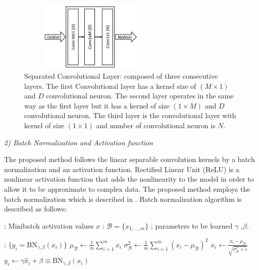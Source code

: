 \begin{figure}
\begin{center}
\includegraphics[height=34mm,width=7.0cm]{Figures/fig3.jpg}
\caption{Separated Convolutional Layer: composed of three consecutive layers. The first Convolutional layer has a kernel size of $(M\times1)$ and $D$  convolutional neuron. The second layer  operates in the same way as the first layer but it has a kernel of size $(1\times M)$ and $D$ convolutional neuron. The third layer is the convolutional layer with kernel of size $(1\times1)$ and number of convolutional neuron is $N$.}
\end{center}
\label{fig3}
\end{figure}

\textit{2)  Batch Normalization and  Activation function}

The proposed method follows the linear separable convolution kernels by a batch normalization and an activation function. Rectified Linear Unit (ReLU) is a nonlinear activation  function that adds the nonlinearity to the model in order to allow it to be approximate to complex data. The proposed method employs the batch normalization which is described in \cite{batchnorm}. Batch normalization algorithm is described as follows:



\vspace*{1.3\baselineskip}
\begin{algorithmic}[1]

\REQUIRE : Minibatch activation values $x$ : $\mathcal B = \{x_{1,\ldots,m}\}$ ; parameters to be learned $\gamma$ ,$\beta$.

\ENSURE  : $\{y_i = \mathrm{BN}_{\gamma,\beta}(x_i)\}$
\vspace*{.7\baselineskip}
\STATE $\mu_{\mathcal B} \leftarrow \frac1m \sum_{i = 1}^m x_i$
\vspace*{.7\baselineskip}
\STATE $\sigma^2_{\mathcal B} \leftarrow \frac1m \sum_{i=1}^m (x_i - \mu_{\mathcal B})^2$
\vspace*{.7\baselineskip}
\STATE $\hat x_i \leftarrow \frac{x_i - \mu_{\mathcal B}}{\sqrt{\sigma_{\mathcal B}^2 + \epsilon}}$
\vspace*{.7\baselineskip}
\STATE $y_i \leftarrow \gamma \hat x_i + \beta \equiv \mathrm{BN}_{\gamma,\beta}(x_i)$

\end{algorithmic}


